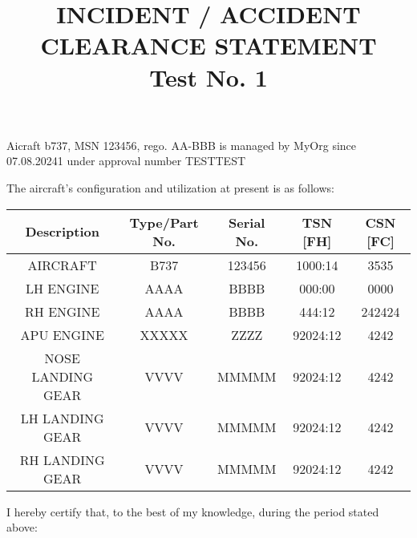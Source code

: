 \documentclass{article}
\title{INCIDENT / ACCIDENT CLEARANCE STATEMENT \\[1ex] Test No. 1}
\date{}
\author{}
\begin{document}
\maketitle

\justifying
Aicraft b737, MSN 123456, rego. AA-BBB is managed by MyOrg since 07.08.20241 under approval number TESTTEST
\par
The aircraft's configuration and utilization at present is as follows:
\vspace{20pt}

\begin{center}
    \begin{tabular}{|c|c|c|c|c|}
        \hline
         \textbf{Description} & \textbf{Type/Part No.} & \textbf{Serial No.} & \textbf{TSN [FH]} & \textbf{CSN [FC]}\\
         \hline
         AIRCRAFT & B737 & 123456 & 1000:14 & 3535 \\
         \hline
         LH ENGINE & AAAA & BBBB & 000:00 & 0000 \\
         \hline
         RH ENGINE & AAAA & BBBB & 444:12 & 242424 \\
         \hline
         APU ENGINE & XXXXX & ZZZZ & 92024:12 & 4242 \\
         \hline
         NOSE LANDING GEAR & VVVV & MMMMM & 92024:12 & 4242 \\
         \hline
         LH LANDING GEAR & VVVV & MMMMM & 92024:12 & 4242 \\
         \hline
         RH LANDING GEAR & VVVV & MMMMM & 92024:12 & 4242 \\
         \hline
    \end{tabular}
\end{center}

\vspace{20pt}

 I hereby certify that, to the best of my knowledge, during the period stated above:

 \vspace{10pt}
\end{document}
